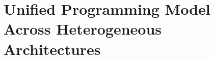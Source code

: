 \chapter{Unified  Programming Model Across Heterogeneous Architectures}
\label{ch:gpu-programming}







